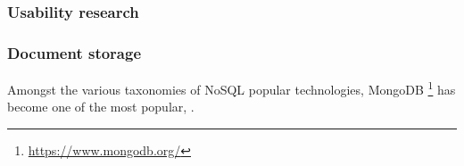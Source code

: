 \cite{saraiya2005insight}

\subsubsection*{Usability research}

\cite{augustine2002discovering}

\subsubsection*{Document storage}\label{subsec:document-storage}

Amongst the various taxonomies of NoSQL popular technologies,
MongoDB \footnote{\url{https://www.mongodb.org/}} has become one of
the most popular, \cite{tudorica2011comparison, mongo2014leading,
  hecht2011nosql, mongo2013top5}.






\cite{chodorow2013mongodb}
